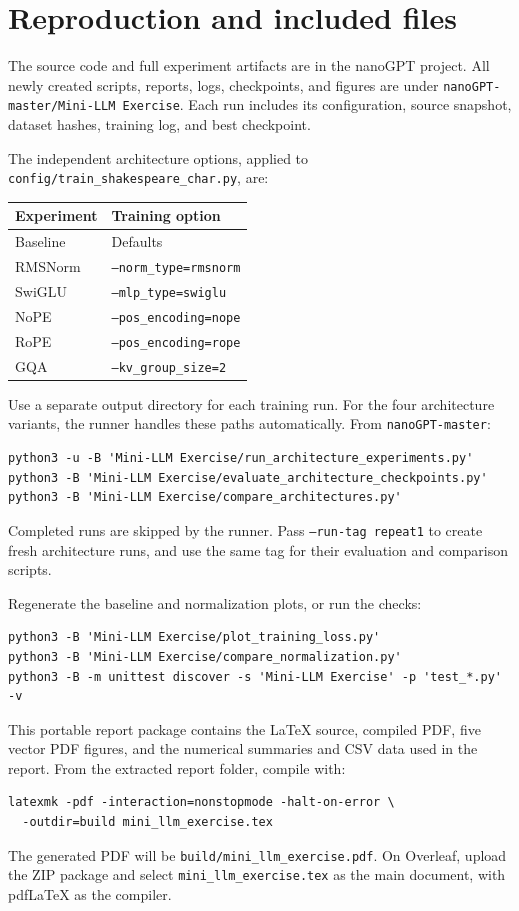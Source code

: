 \documentclass[10pt]{article}
\begin{document}
\clearpage
\section*{Reproduction and included files}

The source code and full experiment artifacts are in the nanoGPT project.
All newly created scripts, reports, logs, checkpoints, and figures are under
\texttt{nanoGPT-master/Mini-LLM Exercise}. Each run includes its configuration,
source snapshot, dataset hashes, training log, and best checkpoint.

The independent architecture options, applied to
\texttt{config/train\_shakespeare\_char.py}, are:
\begin{center}
\small
\begin{tabular}{@{}ll@{}}
\toprule
Experiment & Training option \\
\midrule
Baseline & Defaults \\
RMSNorm & \texttt{--norm\_type=rmsnorm} \\
SwiGLU & \texttt{--mlp\_type=swiglu} \\
NoPE & \texttt{--pos\_encoding=nope} \\
RoPE & \texttt{--pos\_encoding=rope} \\
GQA & \texttt{--kv\_group\_size=2} \\
\bottomrule
\end{tabular}
\end{center}

Use a separate output directory for each training run. For the four architecture
variants, the runner handles these paths automatically. From \texttt{nanoGPT-master}:
\begin{lstlisting}
python3 -u -B 'Mini-LLM Exercise/run_architecture_experiments.py'
python3 -B 'Mini-LLM Exercise/evaluate_architecture_checkpoints.py'
python3 -B 'Mini-LLM Exercise/compare_architectures.py'
\end{lstlisting}
Completed runs are skipped by the runner. Pass \texttt{--run-tag repeat1} to
create fresh architecture runs, and use the same tag for their evaluation and
comparison scripts.

Regenerate the baseline and normalization plots, or run the checks:
\begin{lstlisting}
python3 -B 'Mini-LLM Exercise/plot_training_loss.py'
python3 -B 'Mini-LLM Exercise/compare_normalization.py'
python3 -B -m unittest discover -s 'Mini-LLM Exercise' -p 'test_*.py' -v
\end{lstlisting}

This portable report package contains the \LaTeX{} source, compiled PDF, five
vector PDF figures, and the numerical summaries and CSV data used in the report.
From the extracted report folder, compile with:
\begin{lstlisting}
latexmk -pdf -interaction=nonstopmode -halt-on-error \
  -outdir=build mini_llm_exercise.tex
\end{lstlisting}
The generated PDF will be \texttt{build/mini\_llm\_exercise.pdf}. On Overleaf,
upload the ZIP package and select \texttt{mini\_llm\_exercise.tex} as the main
document, with pdfLaTeX as the compiler.
\end{document}
